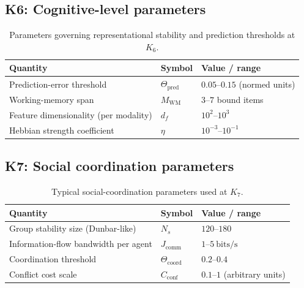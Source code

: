
\subsection*{K6: Cognitive-level parameters}

\begin{table}[htbp]
  \centering
  \caption{Parameters governing representational stability and prediction thresholds at \(K_6\).}
  \label{tab:k6-cognitive-parameters}
  \begin{tabular}{@{}L{0.44\textwidth}L{0.16\textwidth}L{0.23\textwidth}@{}}
    \hline
    Quantity & Symbol & Value / range \\
    \hline
    Prediction-error threshold & \(\Theta_{\mathrm{pred}}\)
        & \(0.05\text{–}0.15\) (normed units) \\
    Working-memory span & \(M_\mathrm{WM}\)
        & \(3\text{–}7\) bound items \\
    Feature dimensionality (per modality)
        & \(d_f\)
        & \(10^2\text{–}10^3\) \\
    Hebbian strength coefficient & \(\eta\)
        & \(10^{-3}\text{–}10^{-1}\) \\
    \hline
  \end{tabular}
\end{table}


\subsection*{K7: Social coordination parameters}

\begin{table}[htbp]
  \centering
  \caption{Typical social-coordination parameters used at \(K_7\).}
  \label{tab:k7-social-parameters}
  \begin{tabular}{@{}L{0.44\textwidth}L{0.16\textwidth}L{0.23\textwidth}@{}}
    \hline
    Quantity & Symbol & Value / range \\
    \hline
    Group stability size (Dunbar-like) & \(N_s\)
        & \(120\text{–}180\) \\
    Information-flow bandwidth per agent & \(J_\mathrm{comm}\)
        & \(1\text{–}5~\mathrm{bits/s}\) \\
    Coordination threshold & \(\Theta_{\mathrm{coord}}\)
        & \(0.2\text{–}0.4\) \\
    Conflict cost scale & \(C_\mathrm{conf}\)
        & \(0.1\text{–}1\) (arbitrary units) \\
    \hline
  \end{tabular}
\end{table}

